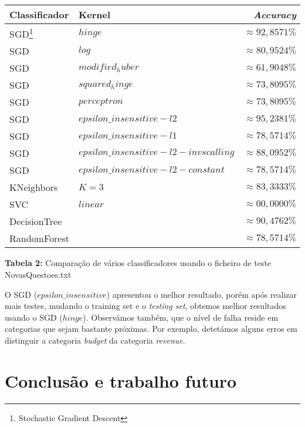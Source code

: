 \documentclass[12pt]{article}
\begin{document}
\begin{center}
    \begin{tabular}{ l | l | r }
      \hline
      \textbf{Classificador} & \textbf{Kernel} & \textbf{\textit{Accuracy}} \\ \hline
      SGD\footnote{Stochastic Gradient Descent} & $hinge$ & $\approx 92,8571\%$ \\ \hline
      SGD & $log$ & $\approx 80,9524\%$ \\ \hline
      SGD & $modified_huber$ & $\approx 61,9048\%$ \\ \hline
      SGD & $squared_hinge$ & $\approx 73,8095\%$ \\ \hline
      SGD & $perceptron$ & $\approx 73,8095\%$ \\ \hline
      SGD & $epsilon\_insensitive-l2$ & $\approx 95,2381\%$ \\ \hline
      SGD & $epsilon\_insensitive-l1$ & $\approx 78,5714\%$ \\ \hline
      SGD & $epsilon\_insensitive-l2-invscalling$ & $\approx 88,0952\%$ \\ \hline
      SGD & $epsilon\_insensitive-l2-constant$ & $\approx 78,5714\%$ \\ \hline
      KNeighbors & $K = 3$ & $\approx 83,3333\%$ \\ \hline
      SVC & $linear$ & $\approx 00,0000\%$ \\ \hline
      DecisionTree & $ $ & $\approx 90,4762\%$ \\ \hline
      RandomForest & $ $ & $\approx 78,5714\%$ \\ \hline
      
      
    \end{tabular}
  \end{center}
  \textbf{Tabela 2:} Comparação de vários classificadores usando o ficheiro de teste NovasQuestoes.txt \newline

  O SGD ($epsilon\_insensitive$) apresentou o melhor resultado, porém após realizar mais testes, mudando
o training set e o \textit{testing set}, obtemos melhor resultados usando o SGD ($hinge$).
Observámos também, que o nível de falha reside em categorias que sejam bastante próximas. Por exemplo, 
detetámos alguns erros em distinguir a categoria \textit{budget} da categoria \textit{revenue}. \newline


\section*{Conclusão e trabalho futuro}
\end{document}
